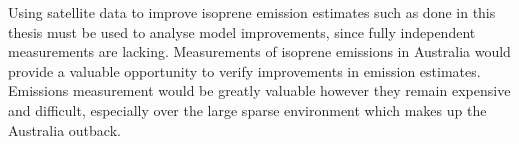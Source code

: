   Using satellite data to improve isoprene emission estimates such as done in this thesis must be used to analyse model improvements, since fully independent measurements are lacking.
  Measurements of isoprene emissions in Australia would provide a valuable opportunity to verify improvements in emission estimates.
  Emissions measurement would be greatly valuable however they remain expensive and difficult, especially over the large sparse environment which makes up the Australia outback.